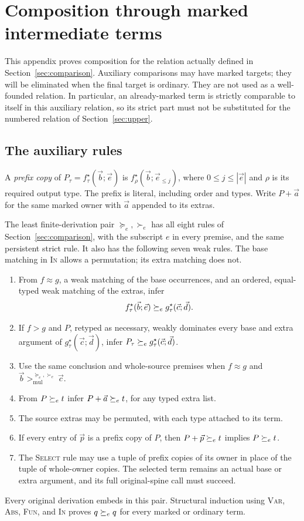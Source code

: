 \section{Composition through marked intermediate terms}
\label{app:composition}

This appendix proves composition for the relation actually defined in
Section~\ref{sec:comparison}. Auxiliary comparisons may have marked
targets; they will be eliminated when the final target is ordinary.
They are not used as a well-founded relation. In particular, an
already-marked term is strictly comparable to itself in this auxiliary
relation, so its strict part must not be substituted for the numbered
relation of Section~\ref{sec:upper}.

\subsection{The auxiliary rules}

A \emph{prefix copy} of
$P_\tau=f^\star_\tau(\vec b;\vec e)$ is
$f^\star_\rho(\vec b;\vec e_{\le j})$, where
$0\le j\le|\vec e|$ and $\rho$ is its required output type.
The prefix is literal, including order and types. Write $P+\vec a$
for the same marked owner with $\vec a$ appended to its extras.

The least finite-derivation pair $\succeq_e,\succ_e$ has all eight
rules of Section~\ref{sec:comparison}, with the subscript $e$ in
every premise, and the same persistent strict rule. It also has
the following seven weak rules. The base matching in \textsc{In}
allows a permutation; its extra matching does not.
\begin{enumerate}
\item[\textsc{In}]
From $f\approx g$, a weak matching of the base occurrences, and
an ordered, equal-typed weak matching of the extras, infer
\[
 f^\star_\tau(\vec b;\vec e)\succeq_e g^\star_\tau(\vec c;\vec d).
\]
\item[\textsc{Marked1}]
If $f>g$ and $P$, retyped as necessary, weakly dominates every
base and extra argument of $g^\star_\tau(\vec c;\vec d)$,
infer $P_\tau\succeq_e g^\star_\tau(\vec c;\vec d)$.
\item[\textsc{Marked2}]
Use the same conclusion and whole-source premises when
$f\approx g$ and
$\vec b>_{\mathrm{mul}}^{\succeq_e,\succ_e}\vec c$.
\item[\textsc{Drop}]
From $P\succeq_e t$ infer $P+\vec a\succeq_e t$, for any typed extra list.
\item[\textsc{Perm}]
The source extras may be permuted, with each type attached to
its term.
\item[\textsc{Copies}]
If every entry of $\vec p$ is a prefix copy of $P$, then
$P+\vec p\succeq_e t$ implies $P\succeq_e t$.
\item[\textsc{PSelect}]
The \textsc{Select} rule may use a tuple of prefix copies of its
owner in place of the tuple of whole-owner copies. The selected
term remains an actual base or extra argument, and its full
original-spine call must succeed.
\end{enumerate}
Every original derivation embeds in this pair. Structural
induction using \textsc{Var}, \textsc{Abs}, \textsc{Fun}, and
\textsc{In} proves $q\succeq_e q$ for every marked or ordinary term.

